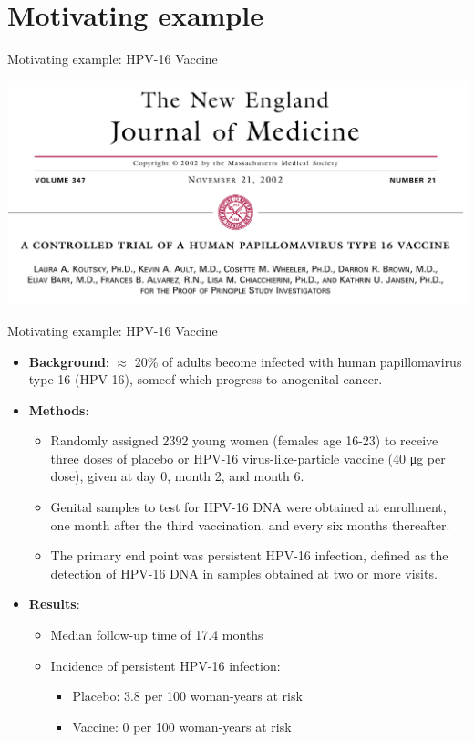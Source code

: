 \documentclass[10pt,handout]{beamer}\usepackage[]{graphicx}\usepackage[]{color}
\begin{document}
\section{Motivating example}

\begin{frame}{Motivating example: HPV-16 Vaccine}
	
	\includegraphics[scale=0.35]{nejm_hpv.png}
	
\end{frame}


\begin{frame}{Motivating example: HPV-16 Vaccine}
	\footnotesize
	\begin{itemize}
		\item \textbf{Background}: $\approx$ 20\% of adults become infected with human papillomavirus type 16 (HPV-16), someof which progress to anogenital cancer. 
		\pause
		\item \textbf{Methods}: 
		\begin{itemize}
			\footnotesize
			\item Randomly assigned 2392 young women (females age 16-23) to receive three doses of placebo or HPV-16 virus-like-particle vaccine (40 μg per dose), given at day 0, month 2, and month 6. 
			\item Genital samples to test for HPV-16 DNA were obtained at enrollment,	one month after the third vaccination, and every six months thereafter. 
			\item The primary end point was persistent HPV-16 infection, defined as the detection of HPV-16 DNA in samples obtained at two or more visits. 
		\end{itemize}
		\pause 
		\item \textbf{Results}: \begin{itemize}
			\footnotesize
			\item Median follow-up time of 17.4 months
			\item Incidence of persistent HPV-16 infection: \begin{itemize}
				\footnotesize
				\item Placebo: 3.8 per 100 woman-years at risk
				\item Vaccine: 0 per 100 woman-years at risk
			\end{itemize}
		\end{itemize}
	\end{itemize}
\end{frame}
\end{document}
